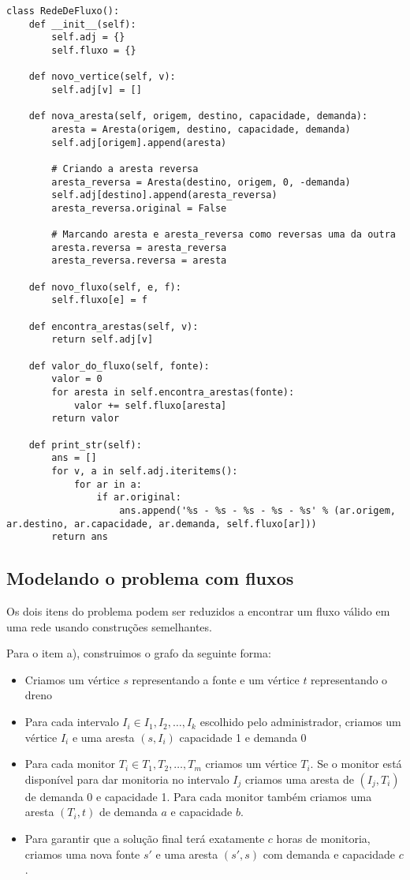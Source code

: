 \documentclass[11pt]{article}
\begin{document}
\begin{verbatim}
class RedeDeFluxo():
    def __init__(self):
        self.adj = {}
        self.fluxo = {}

    def novo_vertice(self, v):
        self.adj[v] = []

    def nova_aresta(self, origem, destino, capacidade, demanda):
        aresta = Aresta(origem, destino, capacidade, demanda)
        self.adj[origem].append(aresta)

        # Criando a aresta reversa
        aresta_reversa = Aresta(destino, origem, 0, -demanda)
        self.adj[destino].append(aresta_reversa)
        aresta_reversa.original = False

        # Marcando aresta e aresta_reversa como reversas uma da outra
        aresta.reversa = aresta_reversa
        aresta_reversa.reversa = aresta

    def novo_fluxo(self, e, f):
        self.fluxo[e] = f

    def encontra_arestas(self, v):
        return self.adj[v]

    def valor_do_fluxo(self, fonte):
        valor = 0
        for aresta in self.encontra_arestas(fonte):
            valor += self.fluxo[aresta]
        return valor

    def print_str(self):
        ans = []
        for v, a in self.adj.iteritems():
            for ar in a:
                if ar.original:
                    ans.append('%s - %s - %s - %s - %s' % (ar.origem, ar.destino, ar.capacidade, ar.demanda, self.fluxo[ar]))
        return ans
\end{verbatim}

\subsection{Modelando o problema com fluxos}
\label{sec-3-2}

Os dois itens do problema podem ser reduzidos a encontrar um fluxo
válido em uma rede usando construções semelhantes.

Para o item a), construimos o grafo da seguinte forma:

\begin{itemize}
\item Criamos um vértice $s$ representando a fonte e um vértice $t$
  representando o dreno
\item Para cada intervalo $I_i \in I_1, I_2, \ldots, I_k$ escolhido pelo
administrador, criamos um vértice $I_i$ e uma aresta $(s, I_i)$
capacidade 1 e demanda 0
\item Para cada monitor $T_i \in T_1, T_2, \ldots, T_m$ criamos um vértice
$T_i$. Se o monitor está disponível para dar monitoria no intervalo
$I_j$ criamos uma aresta de $(I_j, T_i)$ de demanda 0 e
capacidade 1. Para cada monitor também criamos uma aresta
$(T_i, t)$ de demanda $a$ e capacidade $b$.
\item Para garantir que a solução final terá exatamente $c$ horas de
monitoria, criamos uma nova fonte $s'$ e uma aresta $(s', s)$
com demanda e capacidade $c$.
\end{itemize}
\end{document}
